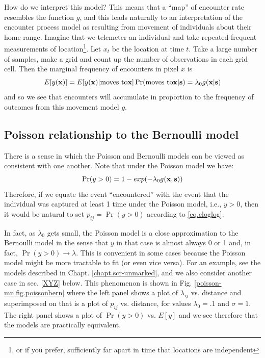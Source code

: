 How do we interpret this model?
This means that a ``map'' of encounter rate 
resembles the function $g$, and this leads naturally to an interpretation
of the encounter process model as resulting from movement of individuals
about their home range. 
Imagine that 
 we telemeter an individual and take repeated frequent measurements
of location\footnote{or if you prefer,
 sufficiently far apart in time that locations are
independent}. Let $x_{t}$ be the location at time $t$. Take a large
number of samples, make a grid and count up the number of observations
in each grid cell. Then the marginal frequency of encounters in pixel
$x$ is
\[
 E[y({\bf x})] = E[y({\bf x})| \mbox{moves to} {\bf x}]
 \Pr(\mbox{moves to} {\bf x}|{\bf s}) = \lambda_{0} g({\bf x}|{\bf s})
\]
and so we see that encounters will accumulate in proportion to the
frequency of outcomes from this movement model $g$.




\subsection{Poisson relationship to the Bernoulli model}

There is a sense in which the Poisson and Bernoulli models can
be viewed as consistent with one another. Note that under the Poisson
model we have:
\begin{equation}
 \Pr(y>0) = 1-exp(-\lambda_{0} g({\bf x},{\bf s}))
\label{eq.cloglog}
\end{equation}
Therefore, if we equate the event ``encountered'' with the event that
the individual was captured at least 1 time under the Poisson model,
i.e., $y>0$, then it would be natural to set $p_{ij} = \Pr(y>0)$
according to \ref{eq.cloglog}.

In fact, as $\lambda_0$ gets small, the Poisson model is a close approximation
to the Bernoulli model in the sense that $y$ in that case is almost
always 0 or 1 and, in fact, $\Pr(y>0) \rightarrow \lambda$.  This is
convenient in some cases because the Poisson model might be more
tractable to fit (or even vice versa). For an example, see the models
described in Chapt. \ref{chapt.scr-unmarked}, and we also consider
another case in sec. \ref{XYZ} below.
This phenomenon is shown in  Fig. 
\ref{poisson-mn.fig.poissonbern} where
the left panel shows a plot of $\lambda_{ij}$ vs. distance and
superimposed on that is a plot of $p_{ij}$ vs. distance, for values
$\lambda_{0} = .1$ and $\sigma = 1$. The right panel shows a plot of
$\Pr(y>0)$ vs. $E[y]$ and we see therefore that the models are
practically equivalent. 

